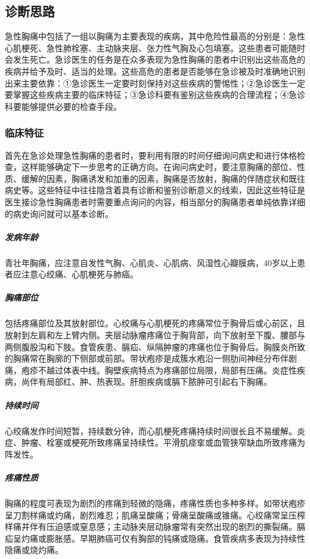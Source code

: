 \subsection{诊断思路}

急性胸痛中包括了一组以胸痛为主要表现的疾病，其中危险性最高的分别是：急性心肌梗死、急性肺栓塞、主动脉夹层、张力性气胸及心包填塞。这些患者可能随时会发生死亡。急诊医生的任务是在众多表现为急性胸痛的患者中识别出这些高危的疾病并给予及时、适当的处理。这些高危的患者是否能够在急诊被及时准确地识别出来主要依靠：①急诊医生一定要时刻保持对这些疾病的警惕性；②急诊医生一定要掌握这些疾病主要的临床特征；③急诊科要有鉴别这些疾病的合理流程；④急诊科要能够提供必要的检查手段。

\subsubsection{临床特征}

首先在急诊处理急性胸痛的患者时，要利用有限的时间仔细询问病史和进行体格检查，这样能够确定下一步思考的正确方向。在询问病史时，要注意胸痛的部位、性质、缓解的因素，胸痛诱发和加重的因素，胸痛是否放射，胸痛的伴随症状和既往病史等。这些特征中往往隐含着具有诊断和鉴别诊断意义的线索，因此这些特征是医生接诊急性胸痛患者时需要重点询问的内容，相当部分的胸痛患者单纯依靠详细的病史询问就可以基本诊断。

\subparagraph{发病年龄}

青壮年胸痛，应注意自发性气胸、心肌炎、心肌病、风湿性心瓣膜病，40岁以上患者应注意心绞痛、心肌梗死与肺癌。

\subparagraph{胸痛部位}

包括疼痛部位及其放射部位。心绞痛与心肌梗死的疼痛常位于胸骨后或心前区，且放射到左肩和左上臂内侧。夹层动脉瘤疼痛位于胸背部，向下放射至下腹、腰部与两侧腹股沟和下肢。食管疾患、膈疝、纵隔肿瘤的疼痛也位于胸骨后。胸膜炎所致的胸痛常在胸廓的下侧部或前部。带状疱疹是成簇水疱沿一侧肋间神经分布伴剧痛，疱疹不越过体表中线。胸壁疾病特点为疼痛部位局限，局部有压痛。炎症性疾病，尚伴有局部红、肿、热表现。肝胆疾病或膈下脓肿可引起右下胸痛。

\subparagraph{持续时间}

心绞痛发作时间短暂，持续数分钟，而心肌梗死疼痛持续时间很长且不易缓解。炎症、肿瘤、栓塞或梗死所致疼痛呈持续性。平滑肌痉挛或血管狭窄缺血所致疼痛为阵发性。

\subparagraph{疼痛性质}

胸痛的程度可表现为剧烈的疼痛到轻微的隐痛，疼痛性质也多种多样。如带状疱疹呈刀割样痛或灼痛，剧烈难忍；肌痛呈酸痛；骨痛呈酸痛或锥痛。心绞痛常呈压榨样痛并伴有压迫感或窒息感；主动脉夹层动脉瘤常有突然出现的剧烈的撕裂痛。膈疝呈灼痛或膨胀感。早期肺癌可仅有胸部的钝痛或隐痛。食管疾病多表现为持续性隐痛或烧灼痛。

